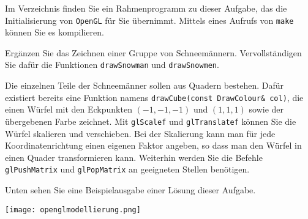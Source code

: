 %
Im Verzeichnis  finden Sie ein 
Rahmenprogramm zu dieser Aufgabe, das die
Initialisierung von \texttt{OpenGL} für Sie übernimmt. Mittels eines 
Aufrufs von \texttt{make} können Sie es kompilieren.

Ergänzen Sie das Zeichnen einer Gruppe von Schneemännern.
Vervollständigen Sie dafür die Funktionen \texttt{drawSnowman} und
\texttt{drawSnowmen}.

Die einzelnen Teile der Schneemänner sollen aus Quadern bestehen.
Dafür existiert bereits eine Funktion namens
\texttt{drawCube(const DrawColour\& col)}, die einen Würfel mit den
Eckpunkten $(-1, -1, -1)$ und $(1, 1, 1)$ sowie der übergebenen Farbe
zeichnet. Mit \texttt{glScalef} und \texttt{glTranslatef} können Sie die
Würfel skalieren und verschieben. Bei der Skalierung kann man für jede 
Koordinatenrichtung einen eigenen Faktor angeben, so dass man den Würfel
in einen Quader transformieren kann. Weiterhin werden Sie die Befehle 
\texttt{glPushMatrix} und \texttt{glPopMatrix} an geeigneten Stellen 
benötigen.

Unten sehen Sie eine Beispielausgabe einer Lösung dieser Aufgabe.

\begin{center}
  \texttt{[image: openglmodellierung.png]}
\end{center}
